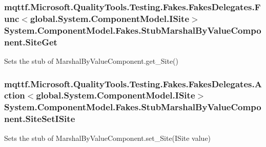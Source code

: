 \hypertarget{class_system_1_1_component_model_1_1_fakes_1_1_stub_marshal_by_value_component_aa3672722ecacaf73c4c02912f7ca2ef3}{
\subsubsection[{Site\-Get}]{\setlength{\rightskip}{0pt plus 5cm}mqttf.\-Microsoft.\-Quality\-Tools.\-Testing.\-Fakes.\-Fakes\-Delegates.\-Func$<$global.\-System.\-Component\-Model.\-I\-Site$>$ System.\-Component\-Model.\-Fakes.\-Stub\-Marshal\-By\-Value\-Component.\-Site\-Get}}\label{class_system_1_1_component_model_1_1_fakes_1_1_stub_marshal_by_value_component_aa3672722ecacaf73c4c02912f7ca2ef3}


Sets the stub of Marshal\-By\-Value\-Component.\-get\-\_\-\-Site()

\hypertarget{class_system_1_1_component_model_1_1_fakes_1_1_stub_marshal_by_value_component_ab14cf98fd24f43de18954c3b2d92c05c}{
\subsubsection[{Site\-Set\-I\-Site}]{\setlength{\rightskip}{0pt plus 5cm}mqttf.\-Microsoft.\-Quality\-Tools.\-Testing.\-Fakes.\-Fakes\-Delegates.\-Action$<$global.\-System.\-Component\-Model.\-I\-Site$>$ System.\-Component\-Model.\-Fakes.\-Stub\-Marshal\-By\-Value\-Component.\-Site\-Set\-I\-Site}}\label{class_system_1_1_component_model_1_1_fakes_1_1_stub_marshal_by_value_component_ab14cf98fd24f43de18954c3b2d92c05c}


Sets the stub of Marshal\-By\-Value\-Component.\-set\-\_\-\-Site(\-I\-Site value)

